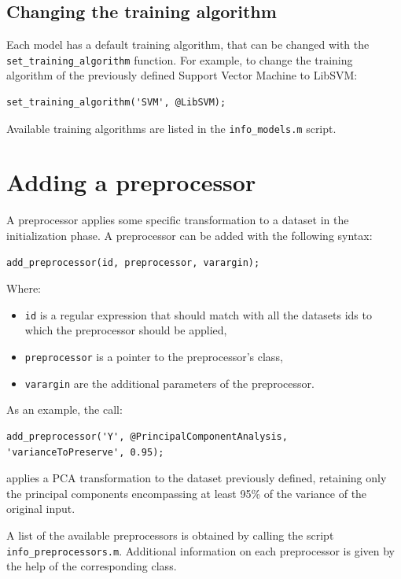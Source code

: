 \subsection{Changing the training algorithm}

Each model has a default training algorithm, that can be changed with the \verb|set_training_algorithm| function. For example, to change the training algorithm of the previously defined Support Vector Machine to LibSVM:

\begin{lstlisting}
set_training_algorithm('SVM', @LibSVM); 
\end{lstlisting}

\noindent Available training algorithms are listed in the \verb|info_models.m| script.

\section{Adding a preprocessor}

A preprocessor applies some specific transformation to a dataset in the initialization phase. A preprocessor can be added with the following syntax:

\begin{lstlisting}
add_preprocessor(id, preprocessor, varargin);
\end{lstlisting}

\noindent Where:

\begin{itemize}
\item \verb|id| is a regular expression that should match with all the datasets ids to which the preprocessor should be applied,
\item \verb|preprocessor| is a pointer to the preprocessor's class,
\item \verb|varargin| are the additional parameters of the preprocessor.
\end{itemize}

\noindent As an example, the call:

\begin{lstlisting}
add_preprocessor('Y', @PrincipalComponentAnalysis, 'varianceToPreserve', 0.95);
\end{lstlisting}

\noindent applies a PCA transformation to the dataset previously defined, retaining only the principal components encompassing at least 95\% of the variance of the original input.

A list of the available preprocessors is obtained by calling the script \verb|info_preprocessors.m|. Additional information on each preprocessor is given by the help of the corresponding class.

